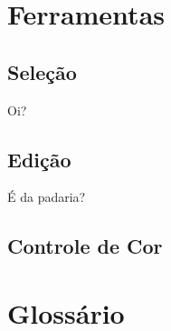 \documentclass[12pt,onecolumn]{article}
\begin{document}
\section{Ferramentas}

  \subsection{Seleção}
    Oi?

  \subsection{Edição}
    É da padaria?
    
  \subsection{Controle de Cor}

\section{Glossário}
\end{document}
